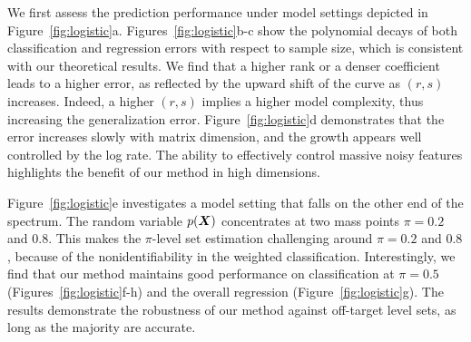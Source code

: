 \documentclass[11pt]{article}
\theoremstyle{definition}
\begin{document}
We first assess the prediction performance under model settings depicted in Figure~\ref{fig:logistic}a. 
Figures~\ref{fig:logistic}b-c show the polynomial decays of both classification and regression errors with respect to sample size, which is consistent with our theoretical results. We find that a higher rank or a denser coefficient leads to a higher error, as reflected by the upward shift of the curve as $(r,s)$ increases. Indeed, a higher $(r,s)$ implies a higher model complexity, thus increasing the generalization error. Figure~\ref{fig:logistic}d demonstrates that the error increases slowly with matrix dimension, and the growth appears well controlled by the log rate. The ability to effectively control massive noisy features highlights the benefit of our method in high dimensions. 

Figure~\ref{fig:logistic}e investigates a model setting that falls on the other end of the spectrum. The random variable $p(\bm X)$ concentrates at two mass points $\pi=0.2$ and $0.8$. This makes the $\pi$-level set estimation challenging around $\pi=0.2$ and $0.8$, because of the nonidentifiability in the weighted classification. Interestingly, we find that our method maintains good performance on classification at $\pi=0.5$ (Figures~\ref{fig:logistic}f-h) and the overall regression (Figure~\ref{fig:logistic}g). The results demonstrate the robustness of our method against off-target level sets, as long as the majority are accurate.
\end{document}
